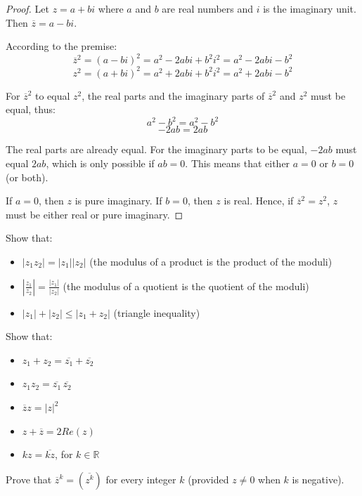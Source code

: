 \documentclass[
	12pt, %
	fleqn, %
	a4paper, %
]{LegrandOrangeBook}
\begin{document}
        \begin{proof}
        Let \( z = a + bi \) where \( a \) and \( b \) are real numbers and \( i \) is the imaginary unit. Then \( \overline{z} = a - bi \). 
        
        According to the premise:
        \[ \overline{z}^2 = (a - bi)^2 = a^2 - 2abi + b^2i^2 = a^2 - 2abi - b^2 \]
        \[ z^2 = (a + bi)^2 = a^2 + 2abi + b^2i^2 = a^2 + 2abi - b^2 \]
        
        For \( \overline{z}^2 \) to equal \( z^2 \), the real parts and the imaginary parts of \( \overline{z}^2 \) and \( z^2 \) must be equal, thus:
        \[ a^2 - b^2 = a^2 - b^2 \]
        \[ -2ab = 2ab \]
        
        The real parts are already equal. For the imaginary parts to be equal, \( -2ab \) must equal \( 2ab \), which is only possible if \( ab = 0 \). This means that either \( a = 0 \) or \( b = 0 \) (or both).
        
        If \( a = 0 \), then \( z \) is pure imaginary. If \( b = 0 \), then \( z \) is real. Hence, if \( \overline{z}^2 = z^2 \), \( z \) must be either real or pure imaginary.
        \end{proof}

        \begin{exercise}
            Show that:
            \begin{itemize}
                \item$\lvert z_1z_2 \rvert = \lvert z_1 \rvert \lvert z_2 \rvert$ \quad (the modulus of a product is the product of the moduli)
                \item $\left\lvert \frac{z_1}{z_2} \right\rvert = \frac{\lvert z_1 \rvert}{\lvert z_2 \rvert}$ \quad (the modulus of a quotient is the quotient of the moduli)
                \item $\lvert z_1 \rvert + \lvert z_2 \rvert \leq \lvert z_1 + z_2 \rvert$ \quad (triangle inequality)
              \end{itemize}
        \end{exercise}
        
        \begin{exercise}
            Show that:
            \begin{itemize}
                \item $z_1 + z_2 = \overline{z_1} + \overline{z_2}$
                \item $z_1z_2 = \overline{z_1} \, \overline{z_2}$
                \item $\overline{z}z = \lvert z \rvert^2$
                \item $z + \overline{z} = 2Re(z)$
                \item $kz = \overline{kz}$, for $k \in \mathbb{R}$
              \end{itemize}
        \end{exercise}
        \begin{exercise}
            Prove that \( \overline{z}^k = (\overline{z^k}) \) for every integer \( k \) (provided \( z \neq 0 \) when \( k \) is negative).
            \end{exercise}
            
\end{document}
